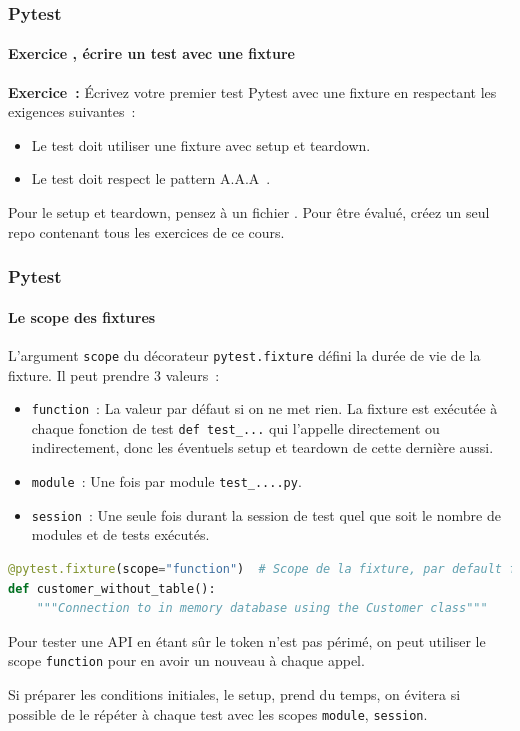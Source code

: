 \documentclass{beamer}
\begin{document}
    \begin{frame}
        \frametitle{Pytest}
        \framesubtitle{Exercice \execcounterdispinc{}, écrire un test avec une fixture}
        \transdissolve
        \textbf{Exercice~:} Écrivez votre premier test Pytest avec une fixture en respectant les exigences suivantes~:
        \begin{itemize}
            \item Le test doit utiliser une fixture avec setup et teardown.
            \item Le test doit respect le pattern A.A.A~.
        \end{itemize}
        \bigbreak
        Pour le setup et teardown, pensez à un fichier .
        \bigbreak
        Pour être évalué, créez un seul repo contenant tous les exercices de ce cours.
    \end{frame}

    \begin{frame}[fragile]
        \frametitle{Pytest}
        \framesubtitle{Le scope des fixtures}
        \transdissolve
        L'argument \lstinline{scope} du décorateur \lstinline{pytest.fixture} défini la durée de vie
        de la fixture.
        Il peut prendre 3 valeurs~:
        \begin{itemize}
            \item \lstinline{function}~: La valeur par défaut si on ne met rien.
            La fixture est exécutée à chaque fonction de test \lstinline{def test_...} qui l'appelle directement ou indirectement, donc les éventuels setup et teardown de cette dernière aussi.
            \item \lstinline{module}~: Une fois par module \lstinline{test_....py}.
            \item \lstinline{session}~: Une seule fois durant la session de test quel que soit le nombre de modules et de tests exécutés.
        \end{itemize}
        \begin{lstlisting}[language=Python]
@pytest.fixture(scope="function")  # Scope de la fixture, par default function
def customer_without_table():
    """Connection to in memory database using the Customer class"""
        \end{lstlisting}

        Pour tester une API en étant sûr le token n'est pas périmé, on peut utiliser le scope \lstinline{function} pour en avoir un nouveau à chaque appel.

        Si préparer les conditions initiales, le setup, prend du temps, on évitera si possible de le répéter à chaque test avec les scopes \lstinline{module}, \lstinline{session}.
    \end{frame}
\end{document}
